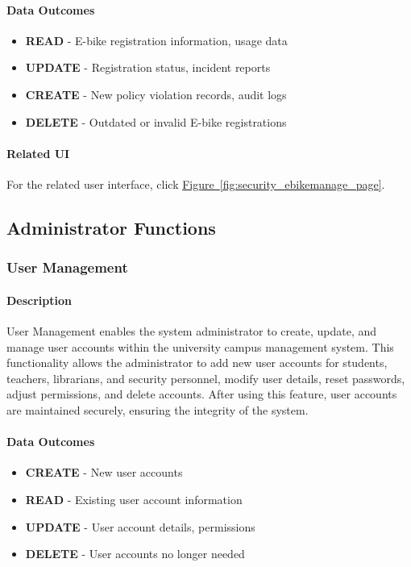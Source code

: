\documentclass[12pt]{article}
\begin{document}
\paragraph{Data Outcomes}
\begin{itemize}
    \item \textbf{READ} - E-bike registration information, usage data
    \item \textbf{UPDATE} - Registration status, incident reports
    \item \textbf{CREATE} - New policy violation records, audit logs
    \item \textbf{DELETE} - Outdated or invalid E-bike registrations
\end{itemize}

\paragraph{Related UI}
For the related user interface, click \hyperref[fig:security_ebikemanage_page]{Figure~\ref*{fig:security_ebikemanage_page}}.

\subsection{Administrator Functions}

\subsubsection{User Management}

\paragraph{Description}
User Management enables the system administrator to create, update, and manage user accounts within the university campus management system. This functionality allows the administrator to add new user accounts for students, teachers, librarians, and security personnel, modify user details, reset passwords, adjust permissions, and delete accounts. After using this feature, user accounts are maintained securely, ensuring the integrity of the system.

\paragraph{Data Outcomes}
\begin{itemize}
    \item \textbf{CREATE} - New user accounts
    \item \textbf{READ} - Existing user account information
    \item \textbf{UPDATE} - User account details, permissions
    \item \textbf{DELETE} - User accounts no longer needed
\end{itemize}
\end{document}
